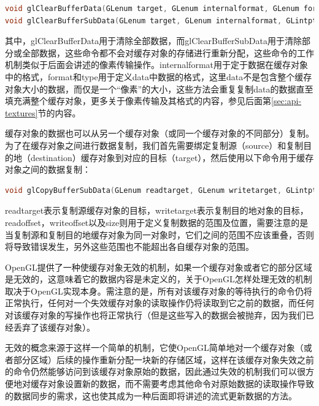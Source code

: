 \begin{lstlisting}[language=C++]
void glClearBufferData​(GLenum target​​, GLenum internalformat​, GLenum format​, GLenum type​, const void * data​);
void glClearBufferSubData​(GLenum target​, GLenum internalformat​, GLintptr offset​, GLsizeiptr size​, GLenum format​, GLenum type​, const void * data​);
\end{lstlisting}

其中，glClearBufferData用于清除全部数据，而glClearBufferSubData用于清除部分或全部数据，这些命令都不会对缓存对象的存储进行重新分配，这些命令的工作机制类似于后面会讲述的像素传输操作。internalformat用于定于数据在缓存对象中的格式，format和type用于定义data中数据的格式，这里data不是包含整个缓存对象大小的数据，而仅是一个“像素”的大小，这些方法会重复复制data的数据直至填充满整个缓存对象，更多关于像素传输及其格式的内容，参见后面第\ref{sec:api-textures}节的内容。
 
缓存对象的数据也可以从另一个缓存对象（或同一个缓存对象的不同部分）复制。为了在缓存对象之间进行数据复制，我们首先需要绑定复制源（source）和复制目的地（destination）缓存对象到对应的目标（target），然后使用以下命令用于缓存对象之间的数据复制：

\begin{lstlisting}[language=C++]
void glCopyBufferSubData​(GLenum readtarget​, GLenum writetarget​, GLintptr readoffset​, GLintptr writeoffset​, GLsizeiptr size​);
\end{lstlisting}

readtarget表示复制源缓存对象的目标，writetarget表示复制目的地对象的目标，readoffset，writeoffset以及size则用于定义复制数据的范围及位置，需要注意的是当复制源和复制目的地缓存对象为同一对象时，它们之间的范围不应该重叠，否则将导致错误发生，另外这些范围也不能超出各自缓存对象的范围。

OpenGL提供了一种使缓存对象无效的机制，如果一个缓存对象或者它的部分区域是无效的，这意味着它的数据内容是未定义的，关于OpenGL怎样处理无效的机制取决于OpenGL实现本身。需注意的是，所有对该缓存对象的等待执行的命令仍将正常执行，任何对一个失效缓存对象的读取操作仍将读取到它之前的数据，而任何对该缓存对象的写操作也将正常执行（但是这些写入的数据会被抛弃，因为我们已经丢弃了该缓存对象）。

无效的概念来源于这样一个简单的机制，它使OpenGL简单地对一个缓存对象（或者部分区域）后续的操作重新分配一块新的存储区域，这样在该缓存对象失效之前的命令仍然能够访问到该缓存对象原始的数据，因此通过失效的机制我们可以很方便地对缓存对象设置新的数据，而不需要考虑其他命令对原始数据的读取操作导致的数据同步的需求，这也使其成为一种后面即将讲述的流式更新数据的方法。

